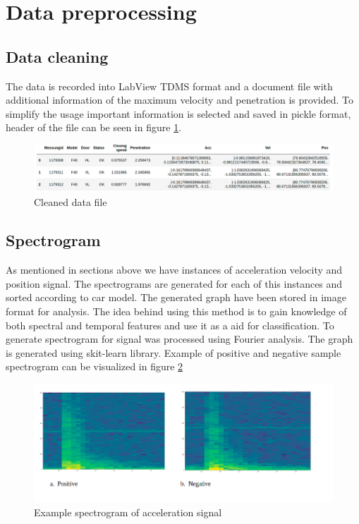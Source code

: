     \section{Data preprocessing}
    \subsection{Data cleaning}
    The data is recorded into LabView TDMS format and a document file with additional information of the maximum velocity and penetration is provided. To simplify the usage important information is selected and saved in pickle format, header of the file can be seen in figure \ref{n8}.
    
     \begin{figure}[h]
     	\centering
     	\includegraphics[width=1\linewidth]{images/pickle.png}
     	\caption{Cleaned data file}
     	\label{n8}
     \end{figure}
     
     
    \subsection{Spectrogram}
    As mentioned in sections above we have instances of acceleration velocity and position signal. The spectrograms are generated for each of this instances and sorted according to car model. The generated graph have been stored in image format for analysis. The idea behind using this method is to gain knowledge of both spectral and temporal features and use it as a aid for classification. 
    To generate spectrogram for signal was processed using Fourier analysis. The graph is generated using skit-learn library.
    Example of positive and negative sample spectrogram can be visualized in figure \ref{n9}
    
    \begin{figure}[h]
    	\centering
    	\includegraphics[width=1\linewidth]{images/spec1.png}
    	\caption{Example spectrogram of acceleration signal }
    	\label{n9}
    \end{figure}
